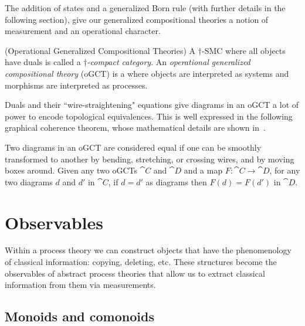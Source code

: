 The addition of states and a generalized Born rule (with further details in the following section), give our generalized compositional theories a notion of measurement and an operational character.

\begin{defn}(Operational Generalized Compositional Theories)
\label{thm:ogct}
A $\dagger$-SMC where all objects have duals is called a \emph{$\dagger$-compact category}. An \emph{operational generalized compositional theory} (oGCT) is a \dcc where objects are interpreted as systems and morphisms are interpreted as processes.
\end{defn}

Duals and their ``wire-straightening" equations give diagrams in an oGCT a lot of power to encode topological equivalences.  This is well expressed in the following graphical coherence theorem, whose mathematical details are shown in~\cite{selinger2011survey}.

\begin{theorem}
Two diagrams in an oGCT are considered equal if one can be smoothly transformed to another by bending, stretching, or crossing wires, and by moving boxes around. Given any two oGCTs $\cat{C}$ and $\cat{D}$ and a map $F:\cat{C}\to\cat{D}$, for any two diagrams $d$ and $d'$ in $\cat{C}$, if $d=d'$ as diagrams then $F(d)=F(d')$ in $\cat{D}$.
\end{theorem}

\section{}

\section{Observables}
\label{sec:observables}

Within a process theory we can construct objects that have the phenomenology of classical information: copying, deleting, etc. These structures become the observables of abstract process theories that allow us to extract classical information from them via measurements.

\subsection{Monoids and comonoids}


